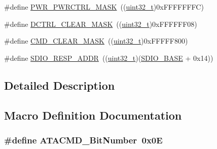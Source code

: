 \begin{DoxyCompactItemize}
\item 
\#define \hyperlink{group___s_d_i_o___private___types_definitions_ga7e6ec7be68d0fbb8fb4e3725cca9a05c}{P\+W\+R\+\_\+\+P\+W\+R\+C\+T\+R\+L\+\_\+\+M\+A\+SK}~((\hyperlink{_p_e___types_8h_a33594304e786b158f3fb30289278f5af}{uint32\+\_\+t})0x\+F\+F\+F\+F\+F\+F\+F\+C)
\item 
\#define \hyperlink{group___s_d_i_o___private___types_definitions_ga9e9fc7810b95805aeeb760bbdd87fa9b}{D\+C\+T\+R\+L\+\_\+\+C\+L\+E\+A\+R\+\_\+\+M\+A\+SK}~((\hyperlink{_p_e___types_8h_a33594304e786b158f3fb30289278f5af}{uint32\+\_\+t})0x\+F\+F\+F\+F\+F\+F08)
\item 
\#define \hyperlink{group___s_d_i_o___private___types_definitions_ga2325d77090e44221b07f8fba5bc9217e}{C\+M\+D\+\_\+\+C\+L\+E\+A\+R\+\_\+\+M\+A\+SK}~((\hyperlink{_p_e___types_8h_a33594304e786b158f3fb30289278f5af}{uint32\+\_\+t})0x\+F\+F\+F\+F\+F800)
\item 
\#define \hyperlink{group___s_d_i_o___private___types_definitions_ga4285ce49b005e3d03ddf9fdc491c4d70}{S\+D\+I\+O\+\_\+\+R\+E\+S\+P\+\_\+\+A\+D\+DR}~((\hyperlink{_p_e___types_8h_a33594304e786b158f3fb30289278f5af}{uint32\+\_\+t})(\hyperlink{openmotestm_2library_2inc_2stm32f10x__map_8h_a95dd0abbc6767893b4b02935fa846f52}{S\+D\+I\+O\+\_\+\+B\+A\+SE} + 0x14))
\end{DoxyCompactItemize}


\subsection{Detailed Description}


\subsection{Macro Definition Documentation}
\subsubsection[{\texorpdfstring{A\+T\+A\+C\+M\+D\+\_\+\+Bit\+Number}{ATACMD_BitNumber}}]{\setlength{\rightskip}{0pt plus 5cm}\#define A\+T\+A\+C\+M\+D\+\_\+\+Bit\+Number~0x0E}\hypertarget{group___s_d_i_o___private___types_definitions_gabd4fd3bb700b879f843ccc867db1832e}{}\label{group___s_d_i_o___private___types_definitions_gabd4fd3bb700b879f843ccc867db1832e}


